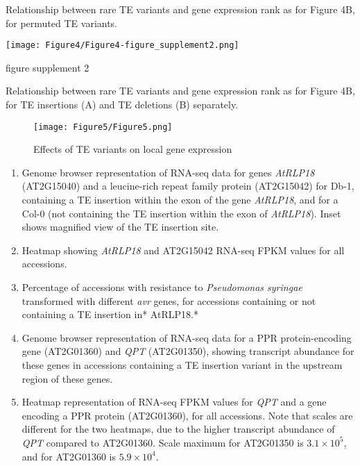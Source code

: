\documentclass[12pt]{article}
\begin{document}
Relationship between rare TE variants and gene expression rank as for
Figure 4B, for permuted TE variants.

\pagebreak


\setcounter{suppfigure}{3}

\begin{suppfigure}
  \centering
  \texttt{[image: Figure4/Figure4-figure\_supplement2.png]}
  \caption{figure supplement 2}
  \label{fig4s2}
\end{suppfigure}

Relationship between rare TE variants and gene expression rank as for
Figure 4B, for TE insertions (A) and TE deletions (B) separately.

\pagebreak


\begin{figure}[!ht]
  \centering
  \texttt{[image: Figure5/Figure5.png]}
  \caption{Effects of TE variants on local gene expression}
  \label{fig5}
\end{figure}

\begin{enumerate}
\def\labelenumi{(\Alph{enumi})}
\item
  Genome browser representation of RNA-seq data for genes \emph{AtRLP18}
  (AT2G15040) and a leucine-rich repeat family protein (AT2G15042) for
  Db-1, containing a TE insertion within the exon of the gene
  \emph{AtRLP18}, and for a Col-0 (not containing the TE insertion
  within the exon of \emph{AtRLP18}). Inset shows magnified view of the
  TE insertion site.
\item
  Heatmap showing \emph{AtRLP18 }and AT2G15042 RNA-seq FPKM values for
  all accessions.
\item
  Percentage of accessions with resistance to \emph{Pseudomonas syringae
  }transformed with different \emph{avr }genes, for accessions
  containing or not containing a TE insertion in* AtRLP18.*
\item
  Genome browser representation of RNA-seq data for a PPR
  protein-encoding gene (AT2G01360) and \emph{QPT }(AT2G01350), showing
  transcript abundance for these genes in accessions containing a TE
  insertion variant in the upstream region of these genes.
\item
  Heatmap representation of RNA-seq FPKM values for \emph{QPT }and a
  gene encoding a PPR protein (AT2G01360), for all accessions. Note that
  scales are different for the two heatmaps, due to the higher
  transcript abundance of \emph{QPT} compared to AT2G01360. Scale
  maximum for AT2G01350 is $3.1\times10^5$, and for AT2G01360 is $5.9\times10^4$.
\end{enumerate}
\end{document}
